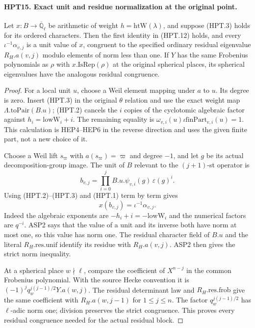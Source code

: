 \paragraph{HPT15. Exact unit and residue normalization at the original point.}
\label{claim:HPT15}
Let $x:B\to\overline{\mathbb Q}_\ell$ be arithmetic of weight
$h=\mathrm{htW}(\lambda)$, and suppose (HPT.3) holds for its
ordered characters.  Then the first identity in (HPT.12) holds,
and every $\iota^{-1}\alpha_{v,j}$ is a unit value of $x$,
congruent to the specified ordinary residual eigenvalue
$R_H.a(v,j)$ modulo elements of norm less than one.
If $Y$ has the same Frobenius polynomials as $\rho$ with
$x.\mathrm{IsRep}(\rho)$ at the original spherical places, its
spherical eigenvalues have the analogous residual congruence.
\begin{proof}
For a local unit $u$, choose a Weil element mapping under $a$
to $u$.  Its degree is zero.  Insert (HPT.3) in the original
$\theta$ relation and use the exact weight map
$\Lambda.\mathrm{toPair}(B.u)$; (HPT.2) cancels the $i$ copies
of the cyclotomic algebraic factor against
$h_i=\mathrm{lowW}_i+i$.  The remaining equality is
$\omega_{v,i}(u)\iota\mathrm{finPart}_{v,i}(u)=1$.
This calculation is HEP4--HEP6 in the reverse direction and uses
the given finite part, not a new choice of it.

Choose a Weil lift $s_\varpi$ with $a(s_\varpi)=\varpi$ and
degree $-1$, and let $g$ be its actual decomposition-group image.
The unit of $B$ relevant to the $(j+1)$-st operator is
\[
             b_{v,j}=\prod_{i=0}^{j}
                          B.u.\psi_{v,i}(g)\,\varepsilon(g)^i.
\]
Using (HPT.2)--(HPT.3) and (HPT.1) term by term gives
\[
                          x(b_{v,j})=\iota^{-1}\alpha_{v,j}.
                                                               \tag{HPT.14}
\]
Indeed the algebraic exponents are $-h_i+i=-\mathrm{lowW}_i$
and the numerical factors are $q^{-i}$.  ASP2 says that the value
of a unit and its inverse both have norm at most one, so this
value has norm one.  The residual character field of $B.u$ and
the literal $R_H.\mathrm{res.unif}$ identify its residue with
$R_H.a(v,j)$.  ASP2 then gives the strict norm inequality.

At a spherical place $w\nmid\ell$, compare the coefficient of
$X^{n-j}$ in the common Frobenius polynomial.  With the source
Hecke convention it is
$(-1)^j q_w^{j(j-1)/2}Y.a(w,j)$.  The residual determinant law
and $R_H.\mathrm{res.frob}$ give the same coefficient with
$R_H.a(w,j-1)$ for $1\leq j\leq n$.  The factor
$q_w^{j(j-1)/2}$ has $\ell$-adic norm one; division preserves
the strict congruence.  This proves every residual congruence
needed for the actual residual block.
\end{proof}

